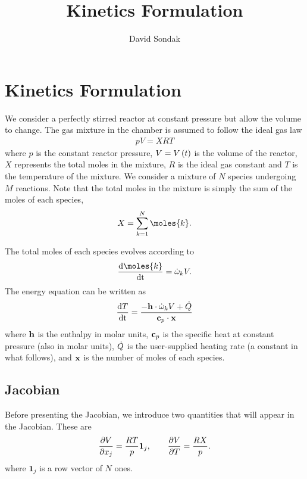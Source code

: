 \documentclass[fontsize=12pt, %
               paper=a4, %
               hyperref]{report}
\begin{document}
\title{\textcolor{titleblue}{Kinetics Formulation} \\[1cm]}

\author{David Sondak}
\date{} %

\maketitle %

\newpage %

\pagestyle{scrheadings} %

\section{Kinetics Formulation}
We consider a perfectly stirred reactor at constant pressure but 
allow the volume to change.  The gas mixture in the chamber 
is assumed to follow the ideal gas law 
\begin{align}
  pV = X R T \label{eq:ideal_gas_law}
\end{align}
where $p$ is the constant reactor pressure, $V = V\left(t\right)$ is 
the volume of the reactor, $X$ represents the total moles in 
the mixture, $R$ is the ideal gas constant and $T$ is the 
temperature of the mixture.  We consider a mixture of $N$ 
species undergoing $M$ reactions.  Note that the total 
moles in the mixture is simply the sum of the moles of each 
species, 
\begin{align}
  X = \sum_{k=1}^{N}{\moles{k}}.
\end{align}

The total moles of each species evolves according to 
\begin{align}
  \odeone{\moles{k}}{\time} = \rrk{k}V.
\end{align}
The energy equation can be written as 
\begin{align}
  \frac{\mathrm{d} T}{\mathrm{d} \mathrm{t}} = \frac{-\mathbf{h}\cdot\dot{\omega}_{k} V + \dot{Q}}{\mathbf{c}_{p}\cdot\mathbf{x}}
\end{align}
where $\mathbf{h}$ is the enthalpy in molar units, $\mathbf{c}_{p}$ is the specific 
heat at constant pressure (also in molar units), $\dot{Q}$ 
is the user-supplied heating rate (a constant in what follows), 
and $\mathbf{x}$ is the number of moles of each species. 

\subsection{Jacobian}
Before presenting the Jacobian, we introduce two quantities 
that will appear in the Jacobian.  These are 
\begin{align}
  \frac{\partial V}{\partial x_{j}} = \frac{R T}{p}\mathbf{1}_{j}, \qquad 
  \frac{\partial V}{\partial T} = \frac{R X}{p}.
\end{align}
where $\mathbf{1}_{j}$ is a row vector of $N$ ones.
\end{document}
